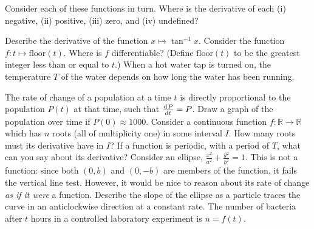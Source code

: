 \begin{questions}
  \questioA Consider each of these functions in turn. Where is the derivative of each (i) negative, (ii) positive, (iii) zero, and (iv) undefined?
  \questioA Describe the derivative of the function $ x \mapsto \tan^{-1} x $.
  \questioM Consider the function $ f : t \mapsto \mathrm{floor}(t) $. Where is $ f $ differentiable? (Define $ \mathrm{floor}(t) $ to be the greatest integer
            less than or equal to $ t $.)
  \questioM When a hot water tap is turned on, the temperature $ T $ of the water depends on how long
            the water has been running.
  \questioM The rate of change of a population at a time $ t $ is directly proportional to the
            population $ P(t) $ at that time, such that $ \od{P}{t} = P $. Draw a graph of the
            population over time if $ P(0) \approx 1000 $.
  \questioM Consider a continuous function $ f : \mathbb{R} \to \mathbb{R} $ which has $ n $ roots
            (all of multiplicity one) in some interval $ I $. How many roots must its derivative have
            in $ I $?
  \questioM If a function is periodic, with a period of $ T $, what can you say about its derivative?
  \questioM Consider an ellipse, $ \frac{x^2}{a^2} + \frac{y^2}{b^2} = 1 $. This is not a function: since both $ (0, b) $ and $ (0, -b) $ are
            members of the function, it fails the vertical line test. However, it would be nice to reason about its
            rate of change \textit{as if it were} a function. Describe the slope of the ellipse as a particle traces the curve in
            an anticlockwise direction at a constant rate.
  \questioM The number of bacteria after $ t $ hours in a controlled laboratory experiment is $ n = f(t) $.
    \begin{parts}

\end{parts}
\end{questions}
